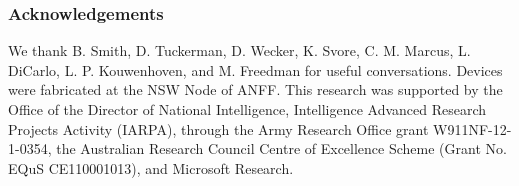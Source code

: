 \subsubsection{Acknowledgements}
We thank B. Smith, D. Tuckerman, D. Wecker, K. Svore, C. M. Marcus, L. DiCarlo, L. P. Kouwenhoven, and M. Freedman for useful conversations. Devices were fabricated at the NSW Node of ANFF. This research was supported by the Office of the Director of National Intelligence, Intelligence Advanced Research Projects Activity (IARPA), through the Army Research Office grant W911NF-12-1-0354, the Australian Research Council Centre of Excellence Scheme (Grant No. EQuS CE110001013), and Microsoft Research.
